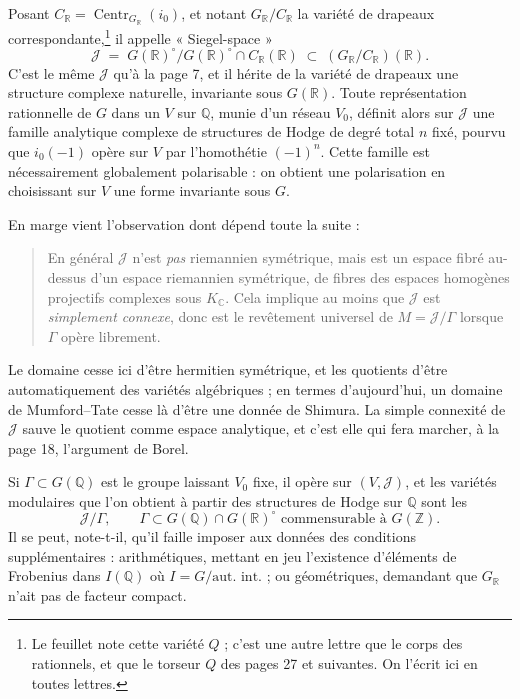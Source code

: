 \documentclass[11pt,a4paper]{article}
\begin{document}
Posant $C_{\mathbb{R}} = \operatorname{Centr}_{G_{\mathbb{R}}}(i_{0})$, et
notant $G_{\mathbb{R}}/C_{\mathbb{R}}$ la variété de drapeaux
correspondante,\footnote{Le feuillet note cette variété $Q$ ; c'est une autre
lettre que le corps des rationnels, et que le torseur $Q$ des pages 27 et
suivantes. On l'écrit ici en toutes lettres.} il appelle « Siegel-space »
\[
\mathcal{J} \;=\; G(\mathbb{R})^{\circ} \big/ G(\mathbb{R})^{\circ} \cap C_{\mathbb{R}}(\mathbb{R})
\;\subset\; (G_{\mathbb{R}}/C_{\mathbb{R}})(\mathbb{R}) .
\]
C'est le même $\mathcal{J}$ qu'à la page 7, et il hérite de la variété de
drapeaux une structure complexe naturelle, invariante sous $G(\mathbb{R})$.
Toute représentation rationnelle de $G$ dans un $V$ sur $\mathbb{Q}$, munie d'un
réseau $V_{0}$, définit alors sur $\mathcal{J}$ une famille analytique complexe
de structures de Hodge de degré total $n$ fixé, pourvu que $i_{0}(-1)$ opère sur
$V$ par l'homothétie $(-1)^{n}$. Cette famille est nécessairement globalement
polarisable : on obtient une polarisation en choisissant sur $V$ une forme
invariante sous $G$.

En marge vient l'observation dont dépend toute la suite :

\begin{quote}
En général $\mathcal{J}$ n'est \emph{pas} riemannien symétrique, mais est un
espace fibré au-dessus d'un espace riemannien symétrique, de fibres des espaces
homogènes projectifs complexes sous $K_{\mathbb{C}}$. Cela implique au moins que
$\mathcal{J}$ est \emph{simplement connexe}, donc est le revêtement universel de
$M = \mathcal{J}/\Gamma$ lorsque $\Gamma$ opère librement.
\end{quote}

Le domaine cesse ici d'être hermitien symétrique, et les quotients d'être
automatiquement des variétés algébriques ; en termes d'aujourd'hui, un domaine
de Mumford--Tate cesse là d'être une donnée de Shimura. La simple connexité de
$\mathcal{J}$ sauve le quotient comme espace analytique, et c'est elle qui fera
marcher, à la page 18, l'argument de Borel.

Si $\Gamma \subset G(\mathbb{Q})$ est le groupe laissant $V_{0}$ fixe, il opère
sur $(V, \mathcal{J})$, et les variétés modulaires que l'on obtient à partir des
structures de Hodge sur $\mathbb{Q}$ sont les
\[
\mathcal{J} / \Gamma , \qquad
\Gamma \subset G(\mathbb{Q}) \cap G(\mathbb{R})^{\circ} \text{ commensurable à } G(\mathbb{Z}) .
\]
Il se peut, note-t-il, qu'il faille imposer aux données des conditions
supplémentaires : arithmétiques, mettant en jeu l'existence d'éléments de
Frobenius dans $I(\mathbb{Q})$ où $I = G/\text{aut. int.}$ ; ou géométriques,
demandant que $G_{\mathbb{R}}$ n'ait pas de facteur compact.
\end{document}
